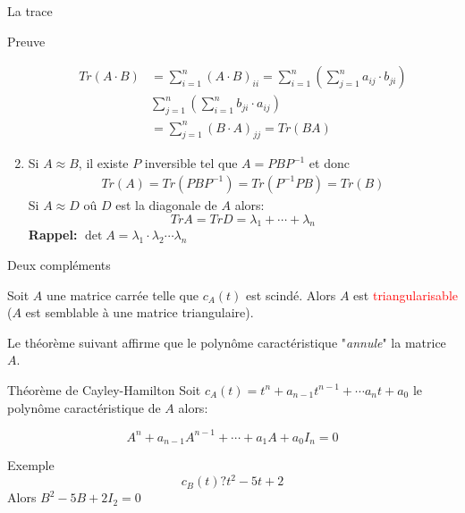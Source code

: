 \begin{parag}{La trace}
\begin{subparag}{Preuve}
\begin{enumerate}
\begin{align*}
            Tr(A\cdot B) &= \sum_{i = 1}^n(A \cdot B)_{ii} = \sum_{i = 1}^n(\sum_{j=1}^n a_{ij}\cdot b_{ji})\\
            &\sum_{j=1}^n(\sum_{i=1}^n b_{ji}\cdot a_{ij})\\
            &= \sum_{j=1}^n (B\cdot A)_{jj} = Tr(BA)
            \end{align*}
            \item Si $A \approx B$, il existe $P$ inversible tel que $A = PBP^{-1}$ et donc 
            \begin{align*}
                Tr(A) = Tr(PBP^{-1}) = Tr(P^{-1}PB) = Tr(B)
            \end{align*}
            Si $A \approx D $ oû $D$ est la diagonale de $A$ alors:
            \[TrA = TrD = \lambda_1 + \cdots + \lambda_n\]
            \textbf{Rappel:} $\det A = \lambda_1\cdot \lambda_2 \cdots \lambda_n$
        \end{enumerate}
    \end{subparag}
    
\end{parag}
\begin{parag}{Deux compléments}
    \begin{theoreme}
        Soit $A$ une matrice carrée telle que $c_A(t)$ est scindé. Alors $A$ est  \textcolor{red}{triangularisable} ($A$ est semblable à une matrice triangulaire).
    \end{theoreme}
    Le théorème suivant affirme que le polynôme caractéristique "\textit{annule}" la matrice $A$.
    \begin{theoreme}{Théorème de Cayley-Hamilton}
        Soit $c_A(t) = t^n + a_{n-1}t^{n-1} + \cdots a_n t + a_0$ le polynôme caractéristique de $A$ alors:
        \begin{formule}
            \[A^n + a_{n-1}A^{n-1} + \cdots + a_1A + a_0I_n = 0\]
        \end{formule}
    \end{theoreme}
    \begin{subparag}{Exemple}
        \[c_B(t) ? t^2 - 5t + 2\]
        Alors $B^2 - 5B + 2I_2 = 0$
    \end{subparag}
\end{parag}
